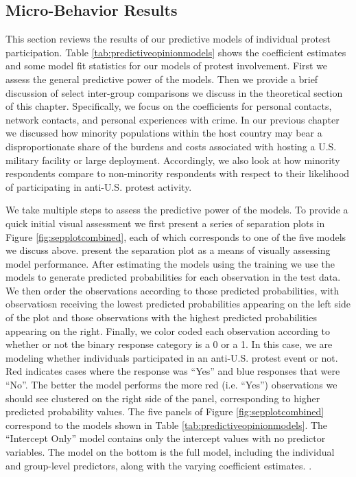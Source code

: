 \subsection*{Micro-Behavior Results}

This section reviews the results of our predictive models of individual protest participation. Table \ref{tab:predictiveopinionmodels} shows the coefficient estimates and some model fit statistics for our models of protest involvement. First we assess the general predictive power of the models. Then we provide a brief discussion of select inter-group comparisons we discuss in the theoretical section of this chapter. Specifically, we focus on the coefficients for personal contacts, network contacts, and personal experiences with crime. In our previous chapter we discussed how minority populations within the host country may bear a disproportionate share of the burdens and costs associated with hosting a U.S. military facility or large deployment. Accordingly, we also look at how minority respondents compare to non-minority respondents with respect to their likelihood of participating in anti-U.S. protest activity.





We take multiple steps to assess the predictive power of the models. To provide a quick initial visual assessment we first present a series of separation plots in Figure \ref{fig:sepplotcombined}, each of which corresponds to one of the five models we discuss above.  present the separation plot as a means of visually assessing model performance. After estimating the models using the training we use the models to generate predicted probabilities for each observation in the test data. We then order the observations according to those predicted probabilities, with observatiosn receiving the lowest predicted probabilities appearing on the left side of the plot and those observations with the highest predicted probabilities appearing on the right. Finally, we color coded each observation according to whether or not the binary response category is a 0 or a 1. In this case, we are modeling whether individuals participated in an anti-U.S. protest event or not. Red indicates cases where the response was ``Yes'' and blue responses that were ``No''. The better the model performs the more red (i.e. ``Yes'') observations we should see clustered on the right side of the panel, corresponding to higher predicted probability values. The five panels of Figure \ref{fig:sepplotcombined} correspond to the models shown in Table \ref{tab:predictiveopinionmodels}. The ``Intercept Only'' model contains only the intercept values with no predictor variables. The model on the bottom is the full model, including the individual and group-level predictors, along with the varying coefficient estimates. . 

